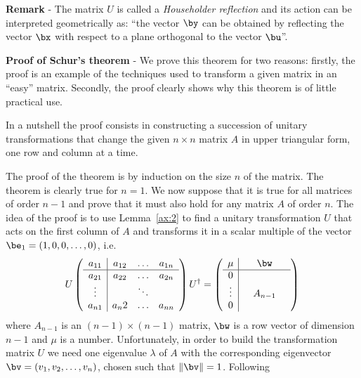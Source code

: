 \noindent
\textbf{Remark} - The matrix $U$ is called a \textit{Householder
  reflection} and its action can be interpreted geometrically as:
``the vector $\by$ can be obtained by reflecting the vector $\bx$ with
respect to a plane orthogonal to the vector $\bu$''.

\noindent 
\textbf{Proof of Schur's theorem} - We prove this theorem for two
reasons: firstly, the proof is an example of the techniques used to
transform a given matrix in an ``easy'' matrix.  Secondly, the proof
clearly shows why this theorem is of little practical use.

In a nutshell the proof consists in constructing a succession of
unitary transformations that change the given $n \times n$ matrix $A$
in upper triangular form, one row and column at a time.

The proof of the theorem is by induction on the size $n$ of the
matrix.  The theorem is clearly true for $n=1$.  We now suppose that
it is true for all matrices of order $n-1$ and prove that it must also
hold for any matrix $A$ of order $n$.  The idea of the proof is to use
Lemma~\ref{ax:2} to find a unitary transformation $U$ that acts on the
first column of $A$ and transforms it in a scalar multiple of the
vector $\be_1 = (1,0,0,\ldots,0)$, i.e.
%
\begin{equation}
  U \left ( \begin{array}{c|ccc}
      a_{1 1} & a_{1 2} & \ldots & a_{1 n} \\ \hline
      a_{2 1} & a_{2 2} & \ldots & a_{2 n} \\
      \vdots & & \ddots & \\
      a_{n 1} & a{_n 2} & \ldots & a_{n n} \\ 
    \end{array} \right ) U^{\dagger} =
  \left ( \begin{array}{c|ccc}
      \mu & & \bw & \\ \hline
      0 & & & \\
      \vdots & & A_{n-1} & \\
      0 & & & \\ 
    \end{array} \right )
  \label{eq:Ev13}
\end{equation}
% 
where $A_{n-1}$ is an $(n-1) \times (n-1)$ matrix, $\bw$ is a row
vector of dimension $n-1$ and $\mu$ is a number.  Unfortunately, in
order to build the transformation matrix $U$ we need one eigenvalue
$\lambda$ of $A$ with the corresponding eigenvector $\bv=(v_1, v_2,
\ldots, v_n)$, chosen such that $\| \bv \|=1$.  Following
